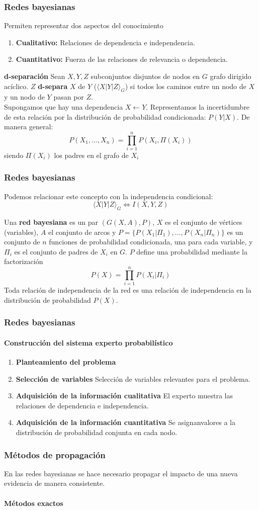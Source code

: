 \documentclass[leqno]{beamer}
\begin{document}
\begin{frame}
\frametitle{Redes bayesianas}
Permiten representar dos aspectos del conocimiento
\begin{enumerate}
\item \textbf{Cualitativo:} Relaciones de dependencia e independencia.
\item \textbf{Cuantitativo:} Fuerza de las relaciones de relevancia o dependencia.
\end{enumerate}

\textbf{d-separación} Sean $X,Y,Z$ subconjuntos disjuntos de nodos en $G$ grafo dirigido acíclico. $Z$ \textbf{d-separa} $X$ de $Y$ ($\langle X|Y|Z \rangle_G$) si todos los caminos entre un nodo de $X$ y un nodo de $Y$ pasan por $Z$.\\

Supongamos que hay una dependencia $X \leftarrow Y$. Representamos la incertidumbre de esta relación por la distribución de probabilidad condicionada: $P(Y|X)$. De manera general:
	\[ P(X_1, \dots,X_n) = \prod\limits_{i=1}^n P(X_i,\Pi(X_i))\]
	siendo $\Pi(X_i)$ los padres en el grafo de $X_i$
\end{frame}


\begin{frame}
\frametitle{Redes bayesianas}
Podemos relacionar este concepto con la independencia condicional:
\[ \langle X|Y|Z \rangle_G \Leftrightarrow I(X,Y,Z) \]

Una \textbf{red bayesiana} es un par $(G(X,A),P)$, $X$ es el conjunto de vértices (variables), $A$ el conjunto de arcos y $P=\{P(X_1|\Pi_1),\dots,P(X_n|\Pi_n)\}$ es un conjunto de $n$ funciones de probabilidad condicionada, una para cada variable, y $\Pi_i$ es el conjunto de padres de $X_i$ en $G$. $P$ define una probabilidad mediante la factorización
\[ P(X) = \prod\limits_{i=1}^n P(X_i|\Pi_i)	\]
Toda relación de independencia de la red es una relación de independencia en la distribución de probabilidad $P(X)$.
\end{frame}

\begin{frame}
\frametitle{Redes bayesianas}
\framesubtitle{Construcción del sistema experto probabilístico}

\begin{enumerate}
\item \textbf{Planteamiento del problema}
\item \textbf{Selección de variables} Selección de variables relevantes para el problema.
\item \textbf{Adquisición de la información cualitativa} El experto muestra las relaciones de dependencia e independencia.
\item \textbf{Adquisición de la información cuantitativa} Se asignanvalores a la distribución de probabilidad conjunta en cada nodo. 
\end{enumerate}
\end{frame}

\begin{frame}
\frametitle{Métodos de propagación}
En las redes bayesianas se hace necesario propagar el impacto de una nueva evidencia de manera consistente.
\framesubtitle{Métodos exactos}
\end{frame}
\end{document}
